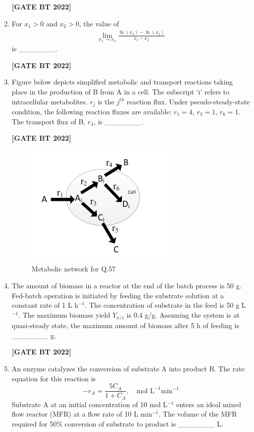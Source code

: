 \documentclass[12pt]{article}
\begin{document}
\begin{enumerate}[leftmargin=2.5em, label=\textbf{Q.\arabic*}., itemsep=2em, resume]
\noindent \textbf{[GATE BT 2022]}

\item For $x_1 > 0$ and $x_2 > 0$, the value of
\begin{align*}
\lim_{x_1 \to x_2} \frac{\ln(x_1) - \ln(x_2)}{x_1 - x_2}
\end{align*}
is \_\_\_\_\_\_\_.

\noindent \textbf{[GATE BT 2022]}

\item Figure below depicts simplified metabolic and transport reactions taking place in the production of B from A in a cell.  
The subscript ‘i’ refers to intracellular metabolites.  
$r_j$ is the $j^{th}$ reaction flux. Under pseudo-steady-state condition, the following reaction fluxes are available: $r_1=4$, $r_3=1$, $r_6=1$.  
The transport flux of B, $r_4$, is \_\_\_\_\_\_\_.

\noindent \textbf{[GATE BT 2022]}
\begin{figure}[H]\centering
\includegraphics[width=0.6\columnwidth]{figs/q57.png}
\caption{Metabolic network for Q.57}
\label{fig:q57}
\end{figure}

\item The amount of biomass in a reactor at the end of the batch process is 50 g.  
Fed-batch operation is initiated by feeding the substrate solution at a constant rate of 1 L h$^{-1}$.  
The concentration of substrate in the feed is 50 g L$^{-1}$.  
The maximum biomass yield $Y_{x/s}$ is 0.4 g/g.  
Assuming the system is at quasi-steady state, the maximum amount of biomass after 5 h of feeding is \_\_\_\_\_\_\_ g.

\noindent \textbf{[GATE BT 2022]}

\item An enzyme catalyzes the conversion of substrate A into product B.  
The rate equation for this reaction is
\[
-r_A = \frac{5C_A}{1 + C_A}, \quad \text{mol L}^{-1}\text{min}^{-1}
\]
Substrate A at an initial concentration of 10 mol L$^{-1}$ enters an ideal mixed flow reactor (MFR) at a flow rate of 10 L min$^{-1}$.  
The volume of the MFR required for 50\% conversion of substrate to product is \_\_\_\_\_\_\_ L.


\end{enumerate}
\end{document}
